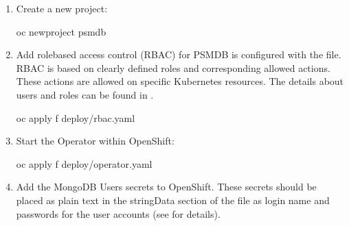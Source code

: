 \documentclass[letterpaper,10pt,english]{sphinxmanual}
\begin{document}
\begin{enumerate}
If you have a  installed, then you have to execute two more commands to be able to manage certificates with a non\sphinxhyphen{}privileged user:

\begin{sphinxVerbatim}[commandchars=\\\{\}]
\PYGZdl{} oc create clusterrole cert\PYGZhy{}admin \PYGZhy{}\PYGZhy{}verb \PYGZhy{}\PYGZhy{}resourceiissuers.certmanager.k8s.io,certificates.certmanager.k8s.io
\PYGZdl{} oc adm policy add\PYGZhy{}cluster\PYGZhy{}role\PYGZhy{}to\PYGZhy{}user cert\PYGZhy{}admin \PYGZlt{}some\PYGZhy{}user\PYGZgt{}
\end{sphinxVerbatim}

\item {} 
Create a new  project:

\begin{sphinxVerbatim}[commandchars=\\\{\}]
\PYGZdl{} oc new\PYGZhy{}project psmdb
\end{sphinxVerbatim}

\item {} 
Add role\sphinxhyphen{}based access control (RBAC) for PSMDB is configured with
the  file. RBAC is
based on clearly defined roles and corresponding allowed actions. These actions are allowed on specific Kubernetes resources. The details
about users and roles can be found in .

\begin{sphinxVerbatim}[commandchars=\\\{\}]
\PYGZdl{} oc apply \PYGZhy{}f deploy/rbac.yaml
\end{sphinxVerbatim}

\item {} 
Start the Operator within OpenShift:

\begin{sphinxVerbatim}[commandchars=\\\{\}]
\PYGZdl{} oc apply \PYGZhy{}f deploy/operator.yaml
\end{sphinxVerbatim}

\item {} 
Add the MongoDB Users secrets to OpenShift. These secrets
should be placed as plain text in the stringData section of the
 file as login name and
passwords for the user accounts (see 
for details).


\end{enumerate}
\end{document}
